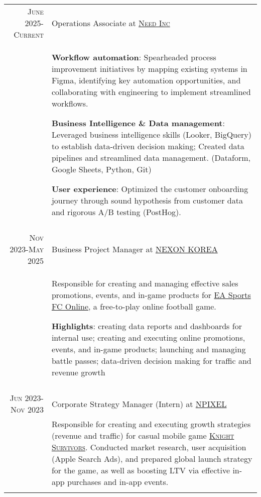 \documentclass[a4paper,10pt]{article} %
\begin{document}
\begin{tabular}{r|p{11cm}}
    \textsc{June 2025-Current} & Operations Associate at
    \href{https://www.need.ai}{\textsc{Need Inc}} \emph{}\\
    & \footnotesize{
        \textbf{Workflow automation}: Spearheaded process improvement initiatives by mapping existing systems in Figma,
        identifying key automation opportunities, and collaborating with engineering to implement streamlined workflows.

        \vspace{2mm}

        \textbf{Business Intelligence \& Data management}: Leveraged business intelligence skills
        (Looker, BigQuery) to establish data-driven decision making; Created data pipelines
        and streamlined data management. (Dataform, Google Sheets, Python, Git)

        \vspace{2mm}
        \textbf{User experience}: Optimized the customer onboarding journey through sound hypothesis from customer
        data and rigorous A/B testing (PostHog).
    }\\

    \multicolumn{2}{c}{} \\

    \textsc{Nov 2023-May 2025} & Business Project Manager at
    \href{https://www.nexon.com}{\textsc{NEXON KOREA}} \emph{}\\
    & \footnotesize{Responsible for creating and managing effective sales promotions, events, and in-game
        products for
        \href{https://fconline.nexon.com}{EA Sports FC Online}, a free-to-play
        online football game.

        \vspace{2mm}

        \textbf{Highlights}: creating data reports and dashboards for internal use;
        creating and executing online promotions, events, and in-game products;
        launching and managing battle passes; data-driven decision making for
        traffic and revenue growth}\\
    \multicolumn{2}{c}{} \\

    \textsc{Jun 2023-Nov 2023} & Corporate Strategy Manager (Intern) at
    \href{https://www.npixel.co.kr}{\textsc{NPIXEL}} \emph{}\\
    & \footnotesize{Responsible for creating and executing
        growth strategies (revenue and traffic) for casual mobile game \href{https://play.google.com/store/apps/details?id=com.npixel.knightsurvivors}{\textsc{Knight Survivors}}.
        Conducted market research, user acquisition (Apple Search Ads), and prepared
        global launch strategy for the game, as well as boosting LTV via effective in-app
        purchases and in-app events.}\\
    \multicolumn{2}{c}{} \\


\end{tabular}
\end{document}
